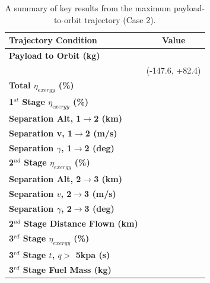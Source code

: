 \begin{table}[ht]%
	\centering
\begin{tabular}{l c } 
	\hline \textbf{Trajectory Condition}
	& Value
	\\
	\hline \textbf{Payload to Orbit (kg)}
	& \textbf{\PayloadToOrbitStandardNoReturn}
	\\
	& \small(-147.6, +82.4)
	\\
	\textbf{Total $\eta_{exergy}$ (\%)}
	& \textbf{\totalExergyEffStandardNoReturn}
	\\
	\hline 
	\textbf{1$^{st}$ Stage $\eta_{exergy}$ (\%)}
	& \textbf{\firstExergyEffStandardNoReturn}
	\\

	\textbf{Separation Alt, 1$\rightarrow$2 (km)}
	& \firstsecondSeparationAltStandardNoReturn
	\\
	\textbf{Separation v, 1$\rightarrow$2 (m/s)}
	& \firstsecondSeparationvStandardNoReturn
	\\
	\textbf{Separation $\gamma$, 1$\rightarrow$2 (deg)}
	& \firstsecondSeparationgammaStandardNoReturn
	\\
	\hline 
	\textbf{2$^{nd}$ Stage $\eta_{exergy}$ (\%)}
	& \textbf{\secondExergyEffStandardNoReturn}
	\\

	\textbf{Separation Alt, 2$\rightarrow$3 (km)}
	& \secondthirdSeparationAltStandardNoReturn
	\\
	\textbf{Separation $v$, 2$\rightarrow$3 (m/s)}
	& \secondthirdSeparationvStandardNoReturn
	\\
	\textbf{Separation $\gamma$, 2$\rightarrow$3 (deg)}
	& \secondthirdSeparationgammaStandardNoReturn
	\\
	\textbf{2$^{nd}$ Stage Distance Flown (km)}
	& \SecondDistStandardNoReturn
	\\
	\hline 
	\textbf{3$^{rd}$ Stage $\eta_{exergy}$ (\%)}
	& \textbf{\thirddExergyEffStandardNoReturn}
	\\

	\textbf{3$^{rd}$ Stage $t$, $q >$ 5kpa (s)}
	& \thirdqOverFiveStandardNoReturn
	\\
	\textbf{3$^{rd}$ Stage Fuel Mass (kg)}
	& \thirdmFuelStandardNoReturn
	\\
	\hline 
\end{tabular} 
	\caption{A summary of key results from the maximum payload-to-orbit trajectory (Case 2).}
	\label{tab:summaryStandardNoReturn}
\end{table}







